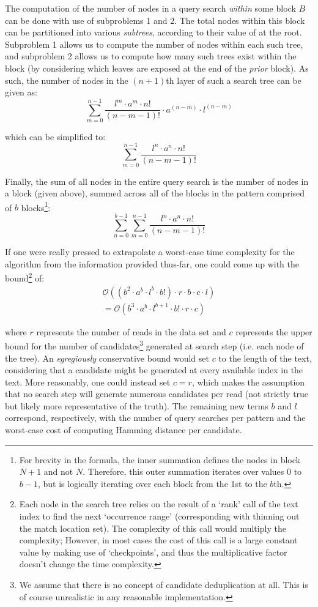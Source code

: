The computation of the number of nodes in a query search \textit{within} some block $B$ can be done with use of subproblems 1 and 2. The total nodes within this block can be partitioned into various \textit{subtrees}, according to their value of  at the root. Subproblem 1 allows us to compute the number of nodes within each such tree, and subproblem 2 allows us to compute how many such trees exist within the block (by considering which leaves are exposed at the end of the \textit{prior} block). As such, the number of nodes in the $(n+1)$th layer of such a search tree can be given as:
$$\sum_{m=0}^{n-1} \dfrac{l^m \cdot{} a^m \cdot{} n! }{(n-m-1)!} \cdot{a^{(n-m)} \cdot{} l^{(n-m)}}$$

which can be simplified to:
$$\sum_{m=0}^{n-1} \dfrac{l^n \cdot{} a^n \cdot{} n! }{(n-m-1)!}$$


Finally, the sum of all nodes in the entire query search is the number of nodes in a block (given above), summed across all of the blocks in the pattern comprised of $b$ blocks\footnote{For brevity in the formula, the inner summation defines the nodes in block $N+1$ and not $N$. Therefore, this outer summation iterates over values 0 to $b-1$, but is logically iterating over each block from the 1st to the $b$th.}:
$$\sum_{n=0}^{b-1}\sum_{m=0}^{n-1} \dfrac{l^n \cdot{} a^n \cdot{} n! }{(n-m-1)!}$$

If one were really pressed to extrapolate a worst-case time complexity for the algorithm from the information provided thus-far, one could come up with the bound\footnote{Each node in the search tree relies on the result of a `rank' call of the \gls{text index} to find the next `occurrence range' (corresponding with thinning out the \gls{match location} set). The complexity of this call would multiply the complexity; However, in most cases the cost of this call is a large constant value by making use of `checkpoints', and thus the multiplicative factor doesn't change the time complexity.} of:
\begin{gather*}
\mathcal{O}((b^2 \cdot{} a^b \cdot{} l^b \cdot{} b!) \cdot{r} \cdot{} b \cdot{} c \cdot{l})\\
 = \mathcal{O}(b^3 \cdot{} a^b \cdot{} l^{b+1} \cdot{} b! \cdot{r} \cdot{} c)
\end{gather*}

where $r$ represents the number of \glspl{read} in the data set and $c$ represents the upper bound for the number of \glspl{candidate}\footnote{We assume that there is no concept of candidate deduplication at all. This is of course unrealistic in any reasonable implementation.} generated at search step (i.e. each node of the tree). An \textit{egregiously} conservative bound would set $c$ to the length of the text, considering that a candidate might be generated at every available index in the text. More reasonably, one could instead set $c=r$, which makes the assumption that no search step will generate numerous candidates per read (not strictly true but likely more representative of the truth). The remaining new terms $b$ and $l$ correspond, respectively, with the number of query searches per \gls{pattern} and the worst-case cost of computing \gls{Hamming distance} per candidate.

